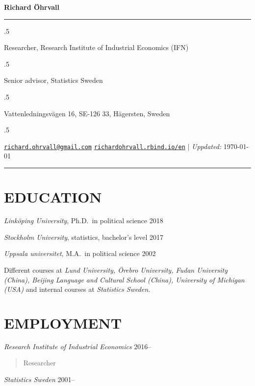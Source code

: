 \documentclass[11pt,]{article}
\begin{document}
\centerline{\huge \bf Richard Öhrvall}

\vspace{2 mm}

\hrule

\vspace{2 mm}

\moveleft.5\hoffset\centerline{Researcher, Research Institute of Industrial Economics (IFN)}
\moveleft.5\hoffset\centerline{Senior advisor, Statistics Sweden}
\moveleft.5\hoffset\centerline{Vattenledningsvägen 16, SE-126 33, Hägersten, Sweden}
\moveleft.5\hoffset\centerline{ \faEnvelopeO \hspace{1 mm} \href{mailto:}{\tt \href{mailto:richard.ohrvall@gmail.com}{\nolinkurl{richard.ohrvall@gmail.com}}} \hspace{1 mm}     \faGlobe \hspace{1 mm} \href{https://richardohrvall.rbind.io/en}{\tt richardohrvall.rbind.io/en}    | \emph{Uppdated:} \today  }

\vspace{2 mm}

\hrule


\hypertarget{education}{%
\section{EDUCATION}\label{education}}

\emph{Linköping University}, Ph.D.~in political science \hfill 2018

\emph{Stockholm University}, statistics, bachelor's level \hfill 2017

\emph{Uppsala universitet}, M.A.~in political science \hfill 2002

Different courses at \emph{Lund University, Örebro University, Fudan
University (China), Beijing Language and Cultural School (China),
University of Michigan (USA)} and internal courses at \emph{Statistics
Sweden}.

\hypertarget{employment}{%
\section{EMPLOYMENT}\label{employment}}

\emph{Research Institute of Industrial Economics} \hfill 2016--

\begin{quote}
Researcher
\end{quote}

\emph{Statistics Sweden} \hfill 2001--
\end{document}
